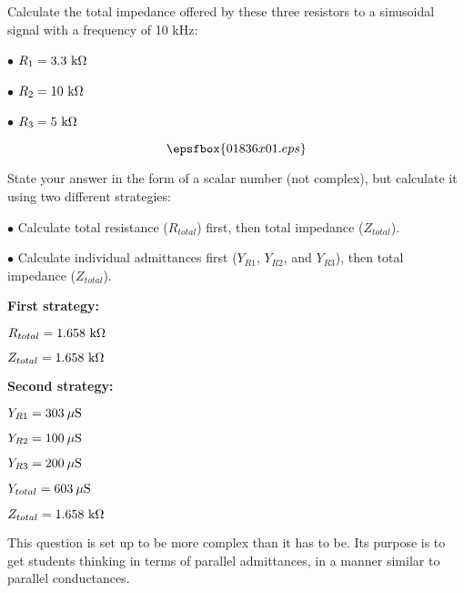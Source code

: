 

Calculate the total impedance offered by these three resistors to a sinusoidal signal with a frequency of 10 kHz:

\medskip
\item{$\bullet$} $R_1 = 3.3 \hbox{ k}\Omega$
\item{$\bullet$} $R_2 = 10 \hbox{ k}\Omega$
\item{$\bullet$} $R_3 = 5 \hbox{ k}\Omega$
\medskip

$$\epsfbox{01836x01.eps}$$

State your answer in the form of a scalar number (not complex), but calculate it using two different strategies:

\medskip
\item{$\bullet$} Calculate total resistance ($R_{total}$) first, then total impedance ($Z_{total}$).
\item{$\bullet$} Calculate individual admittances first ($Y_{R1}$, $Y_{R2}$, and $Y_{R3}$), then total impedance ($Z_{total}$).
\medskip







\noindent
{\bf First strategy:}

$R_{total} = 1.658 \hbox{ k}\Omega$

$Z_{total} = 1.658 \hbox{ k}\Omega$

\vskip 10pt

\goodbreak

\noindent
{\bf Second strategy:}

$Y_{R1} = 303 \> \mu \hbox{S}$

$Y_{R2} = 100 \> \mu \hbox{S}$

$Y_{R3} = 200 \> \mu \hbox{S}$

$Y_{total} = 603 \> \mu \hbox{S}$

$Z_{total} = 1.658 \hbox{ k}\Omega$







This question is set up to be more complex than it has to be.  Its purpose is to get students thinking in terms of parallel admittances, in a manner similar to parallel conductances.




